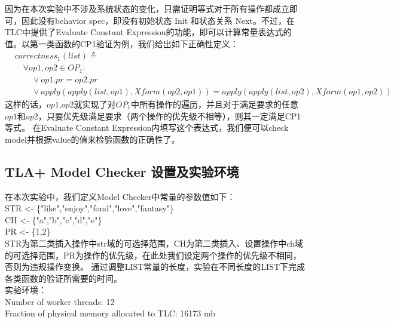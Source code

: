 因为在本次实验中不涉及系统状态的变化，只需证明等式对于所有操作都成立即可，因此没有behavior spec，即没有初始状态 Init 和状态关系 Next。不过，在TLC中提供了Evaluate Constant Expression的功能，即可以计算常量表达式的值。以第一类函数的CP1验证为例，我们给出如下正确性定义：
\begin{align*}
 & correctness_1 (list) \triangleq \\
 & \quad \forall op1,op2 \in OP_1:\\
 & \quad \quad \lor op1.pr = op2.pr\\
 & \quad \quad \lor apply(apply(list,op1),Xform(op2, op1)) = apply(apply(list,op2),Xform(op1, op2))  
\end{align*}
这样的话，$op1$,$op2$就实现了对$OP_1$中所有操作的遍历，并且对于满足要求的任意$op1$和$op2$，只要优先级满足要求（两个操作的优先级不相等），则其一定满足CP1等式。
在Evaluate Constant Expression内填写这个表达式，我们便可以check model并根据value的值来检验函数的正确性了。

\subsection{TLA+ Model Checker 设置及实验环境}
在本次实验中，我们定义Model Checker中常量的参数值如下：\\
STR <- \{"like","enjoy","fond","love","fantasy"\} \\
CH <- \{"a","b","c","d","e"\}\\
PR <- \{1,2\}\\
STR为第二类插入操作中str域的可选择范围，CH为第二类插入、设置操作中ch域的可选择范围，PR为操作的优先级，在此处我们设定两个操作的优先级不相同，否则为违规操作变换。
通过调整LIST常量的长度，实验在不同长度的LIST下完成各类函数的验证所需要的时间。\\

实验环境：\\
Number of worker threads: 12\\
Fraction of physical memory allocated to TLC: 16173 mb

